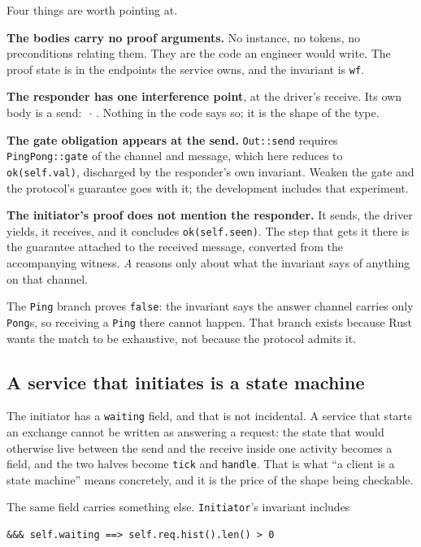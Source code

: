 \documentclass[11pt]{article}
\newcommand{\code}[1]{\texttt{#1}}
\newcommand{\chipL}[1]{\fcolorbox{leftmv}{white}{\color{leftmv}\ttfamily\scriptsize\vphantom{Ay}#1}}
\newcommand{\chipN}[1]{\fcolorbox{neutralmv}{white}{\color{neutralmv}\ttfamily\scriptsize\vphantom{Ay}#1}}
\begin{document}
Four things are worth pointing at.

\textbf{The bodies carry no proof arguments.} No instance, no tokens, no
preconditions relating them. They are the code an engineer would write. The
proof state is in the endpoints the service owns, and the invariant is
\code{wf}.

\textbf{The responder has one interference point}, at the driver's receive. Its
own body is a send: \chipN{N}$\,\cdot\,$\chipL{L}. Nothing in the code says so;
it is the shape of the type.

\textbf{The gate obligation appears at the send.} \code{Out::send} requires
\code{PingPong::gate} of the channel and message, which here reduces to
\code{ok(self.val)}, discharged by the responder's own invariant. Weaken the
gate and the protocol's guarantee goes with it; the development includes that
experiment.

\textbf{The initiator's proof does not mention the responder.} It sends, the
driver yields, it receives, and it concludes \code{ok(self.seen)}. The step that
gets it there is the guarantee attached to the received message, converted from
the accompanying witness. \emph{A} reasons only about what the invariant says of
anything on that channel.

The \code{Ping} branch proves \code{false}: the invariant says the answer channel
carries only \code{Pong}s, so receiving a \code{Ping} there cannot happen. That
branch exists because Rust wants the match to be exhaustive, not because the
protocol admits it.

\subsection*{A service that initiates is a state machine}

The initiator has a \code{waiting} field, and that is not incidental. A service
that starts an exchange cannot be written as answering a request: the state that
would otherwise live between the send and the receive inside one activity
becomes a field, and the two halves become \code{tick} and \code{handle}. That
is what ``a client is a state machine'' means concretely, and it is the price of
the shape being checkable.

The same field carries something else. \code{Initiator}'s invariant includes

\begin{lstlisting}
&&& self.waiting ==> self.req.hist().len() > 0
\end{lstlisting}
\end{document}
